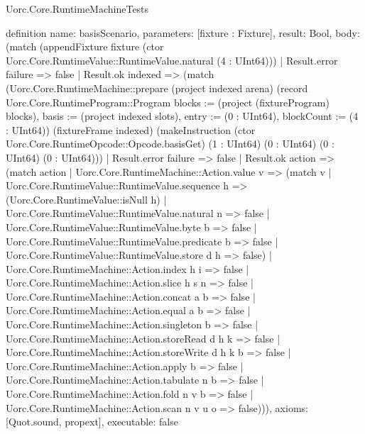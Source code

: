 \begin{lexlean}{Uorc.Core.RuntimeMachineTests}
\begin{semanticmodule}
definition{
  name: basisScenario,
  parameters: [fixture : Fixture],
  result: Bool,
  body: (match (appendFixture fixture (ctor Uorc.Core.RuntimeValue::RuntimeValue.natural (4 : UInt64)))
    | Result.error failure => false
    | Result.ok indexed => (match (Uorc.Core.RuntimeMachine::prepare (project indexed arena) (record Uorc.Core.RuntimeProgram::Program {blocks := (project (fixtureProgram) blocks), basis := (project indexed slots), entry := (0 : UInt64), blockCount := (4 : UInt64)}) (fixtureFrame indexed) (makeInstruction (ctor Uorc.Core.RuntimeOpcode::Opcode.basisGet) (1 : UInt64) (0 : UInt64) (0 : UInt64) (0 : UInt64)))
      | Result.error failure => false
      | Result.ok action => (match action
        | Uorc.Core.RuntimeMachine::Action.value v => (match v
          | Uorc.Core.RuntimeValue::RuntimeValue.sequence h => (Uorc.Core.RuntimeValue::isNull h)
          | Uorc.Core.RuntimeValue::RuntimeValue.natural n => false
          | Uorc.Core.RuntimeValue::RuntimeValue.byte b => false
          | Uorc.Core.RuntimeValue::RuntimeValue.predicate b => false
          | Uorc.Core.RuntimeValue::RuntimeValue.store d h => false)
        | Uorc.Core.RuntimeMachine::Action.index h i => false
        | Uorc.Core.RuntimeMachine::Action.slice h s n => false
        | Uorc.Core.RuntimeMachine::Action.concat a b => false
        | Uorc.Core.RuntimeMachine::Action.equal a b => false
        | Uorc.Core.RuntimeMachine::Action.singleton b => false
        | Uorc.Core.RuntimeMachine::Action.storeRead d h k => false
        | Uorc.Core.RuntimeMachine::Action.storeWrite d h k b => false
        | Uorc.Core.RuntimeMachine::Action.apply b => false
        | Uorc.Core.RuntimeMachine::Action.tabulate n b => false
        | Uorc.Core.RuntimeMachine::Action.fold n v b => false
        | Uorc.Core.RuntimeMachine::Action.scan n v u o => false))),
  axioms: [Quot.sound, propext],
  executable: false
}


\end{semanticmodule}
\end{lexlean}
